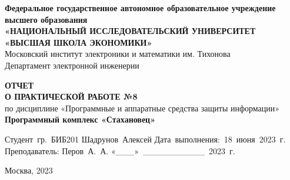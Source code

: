 
\begin{titlepage}
    \begin{center}

        \timesfont
        {\large\bf\timesfont Федеральное‌ ‌государственное‌ ‌автономное‌ ‌образовательное‌ ‌учреждение‌ ‌высшего‌ образования\\}
        {\large\bf\timesfont «НАЦИОНАЛЬНЫЙ‌ ‌ИССЛЕДОВАТЕЛЬСКИЙ‌ ‌УНИВЕРСИТЕТ‌ «ВЫСШАЯ‌ ‌ШКОЛА‌ ‌ЭКОНОМИКИ»‌\\}
        Московский‌ ‌институт‌ ‌электроники‌ ‌и‌ ‌математики‌ ‌им. Тихонова‌\\
        Департамент‌ ‌электронной‌ ‌инженерии‌\\

        \vfill
        \vfill

        {\bf\timesfont ОТЧЕТ \\
            О ПРАКТИЧЕСКОЙ РАБОТЕ №8} \\
        по дисциплине «Программные и аппаратные средства защиты информации» \\
        {\bf\timesfont Программный комплекс «Стахановец»} \\


        \vfill
        \vfill
        \vfill

        \hfill\vbox
        {
            \hbox{Студент гр. БИБ201}
            \hbox{Шадрунов Алексей}
            \hbox{Дата выполнения: 18 июня 2023 г.}
            \hbox{}
            \hbox{Преподаватель:}
            \hbox{Перов А. А.}
            \hbox{«\_\_\_» \_\_\_\_\_\_\_\_\_\_ 2023 г.}
        }

        \vfill

        Москва, 2023
    \end{center}
\end{titlepage}
